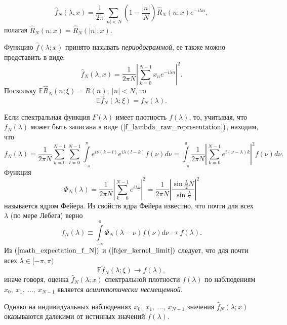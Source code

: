 \begin{equation}
	\hat{f}_N(\lambda, x) = \frac{1}{2\pi} \sum\limits_{|n| < N}{\left(1 - \frac{|n|}{N}\right)\hat{R}_N(n; x)e^{-i\lambda n}},
\end{equation}
полагая $\hat{R}_N(n;x) = \hat{R}_N(|n|;x).$

Функцию $\hat{f}(\lambda; x)$ принято называть \textit{периодограммой}, ее также можно представить в виде:
\begin{equation}
	\hat{f}_N(\lambda, x) = \frac{1}{2\pi N}{\left|\sum\limits_{k=0}^{N-1}{x_n e^{-i \lambda n}}\right|^2.}
\end{equation}
Поскольку $\mathbb{E} \hat{R}_N(n; \xi) = R(n),~ |n| < N$, то
\begin{equation}
	\mathbb{E} \hat{f}_N(\lambda;\xi) = f_N(\lambda).
	\label{math_expectation_f_N}
\end{equation}

Если спектральная функция $F(\lambda)$ имеет плотность $f(\lambda)$, то, учитывая, что $f_N(\lambda)$ может быть записана в виде $(\ref{f_lambda_raw_representation})$, находим, что
\[f_N(\lambda) = \frac{1}{2\pi N} \sum\limits_{k=0}^{N-1} \sum\limits_{l = 0}^{N-1}{\int\limits_{-\pi}^{\pi}{e^{i\nu(k-l)} e^{i\lambda(l-k)}f(\nu) d\nu}} = \int\limits_{-\pi}^{\pi}{\frac{1}{2\pi N} \left|\sum\limits_{k=0}^{N-1}{e^{i(\nu - \lambda)k}}\right|^2 f(\nu) d\nu}.\]
Функция
\[\Phi_N(\lambda) = \frac{1}{2\pi N} \left|\sum\limits_{k=0}^{N-1}{e^{i\lambda k}}\right|^2 = \frac{1}{2\pi N} \left|\frac{\sin{\frac{\lambda}{2}N}}{\sin{\frac{\lambda}{2}}}\right|^2\]
называется ядром Фейера. Из свойств ядра Фейера известно, что почти для всех $\lambda$ (по мере Лебега) верно
\begin{equation}
	f_N(\lambda) \equiv \int\limits_{-\pi}^{\pi}{\Phi_N(\lambda - \nu)f(\nu)d\nu} \to f(\lambda).
	\label{fejer_kernel_limit}
\end{equation}
Из $(\ref{math_expectation_f_N})$ и $(\ref{fejer_kernel_limit})$ следует, что для почти всех $\lambda \in [-\pi,\pi)$
\begin{equation}
	\mathbb{E} \hat{f}_N(\lambda; \xi) \to f(\lambda),
	\label{feyer_consequence}
\end{equation}
иначе говоря, оценка $\hat{f}_N(\lambda; x)$ спектральной плотности $f(\lambda)$ по наблюдениям $x_0,~ x_1,~ \dots,~ x_{N-1}$ является \textit{асимптотически несмещенной}.

Однако на индивидуальных наблюдениях $x_0,~ x_1,~ \dots,~ x_{N-1}$ значения $\hat{f}_N(\lambda;x)$ оказываются далекими от истинных значений $f(\lambda)$.

